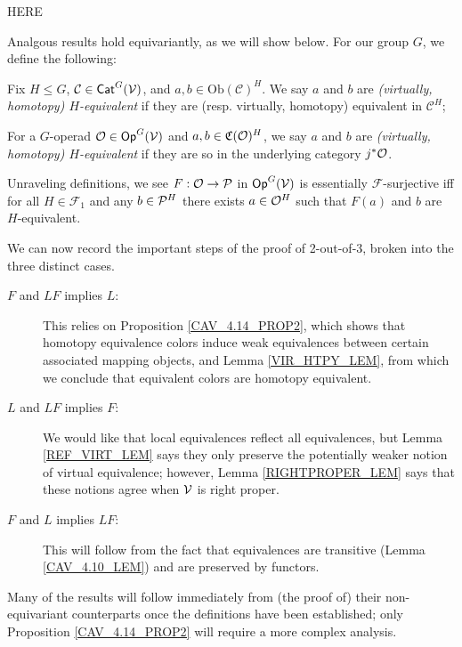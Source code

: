 \documentclass[a4paper,10pt
,draft
]{article}%
\renewcommand{\F}{\mathcal F}
\renewcommand{\1}{\eta}%
\begin{document}
{\color{red} HERE}





Analgous results hold equivariantly, as we will show below. For our group $G$, we define the following:
\begin{definition}
      \label{EQUIVG_DEF}
      Fix $H \leq G$, $\mathcal{C}\in \Cat^G(\V)$, and $a,b\in \mathrm{Ob}(\mathcal{C})^H$.
      We say $a$ and $b$ are 
      \textit{(virtually, homotopy) $H$-equivalent}
      if they are (resp. virtually, homotopy) equivalent in $\mathcal{C}^H$;
      
      For a $G$-operad $\O\in \mathsf{Op}^G(\V)$ and $a,b\in \C(\O)^H$, we say $a$ and $b$ are
      {\em (virtually, homotopy) $H$-equivalent}
      if they are so in the underlying category $j^*\O$. 
\end{definition}


\begin{remark}
      \label{ESS_SUR_REM}
      Unraveling definitions, we see
      $F: \O \to \P$ in $\Op^G(\V)$ is essentially $\F$-surjective iff
      for all $H \in \F_1$ and any $b \in \P^H$ there exists $a \in \O^H$ such that $F(a)$ and $b$ are $H$-equivalent.
\end{remark}

We can now record the important steps of the proof of 2-out-of-3, broken into the three distinct cases.
\begin{description}
\item [$F$ and $LF$ implies $L$:] This relies on Proposition \ref{CAV_4.14_PROP2}, which shows that
      homotopy equivalence colors induce weak equivalences between certain associated mapping objects,
      and Lemma \ref{VIR_HTPY_LEM}, from which we conclude that equivalent colors are homotopy equivalent.
\item [$L$ and $LF$ implies $F$:] We would like that local equivalences reflect all equivalences, but Lemma \ref{REF_VIRT_LEM} says they only preserve the potentially weaker notion of virtual equivalence;
      however, Lemma \ref{RIGHTPROPER_LEM} says that these notions agree when $\V$ is right proper.
\item [$F$ and $L$ implies $LF$:] This will follow from the fact that equivalences are transitive (Lemma \ref{CAV_4.10_LEM}) and are preserved by functors.
\end{description}
%
Many of the results will follow immediately from (the proof of) their non-equivariant counterparts once the definitions have been established;
only Proposition \ref{CAV_4.14_PROP2} will require a more complex analysis.
\end{document}
